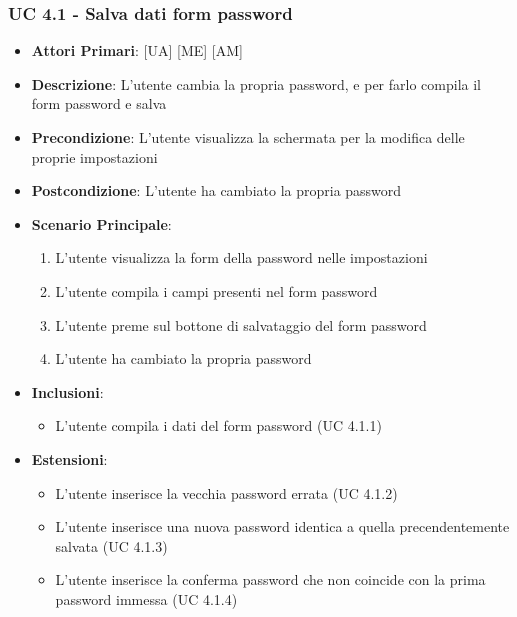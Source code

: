 			\subsubsection{UC 4.1 - Salva dati form password}
			\begin{itemize}
				\item \textbf{Attori Primari}: [UA] [ME] [AM]
				\item \textbf{Descrizione}: L'utente cambia la propria password, e per farlo compila il form password e salva
				\item \textbf{Precondizione}: L'utente visualizza la schermata per la modifica delle proprie impostazioni
				\item \textbf{Postcondizione}: L'utente ha cambiato la propria password
				\item \textbf{Scenario Principale}:
				\begin{enumerate}
					\item{L'utente visualizza la form della password nelle impostazioni}
					\item{L'utente compila i campi presenti nel form password}
					\item{L'utente preme sul bottone di salvataggio del form password}
					\item{L'utente ha cambiato la propria password}
				\end{enumerate}	
				\item \textbf{Inclusioni}:
					\begin{itemize}
						\item L'utente compila i dati del form password (UC 4.1.1)
					\end{itemize}
				\item \textbf{Estensioni}:
					\begin{itemize}
						\item L'utente inserisce la vecchia password errata (UC 4.1.2)
						\item L'utente inserisce una nuova password identica a quella precendentemente salvata (UC 4.1.3)
						\item L'utente inserisce la conferma password che non coincide con la prima password immessa (UC 4.1.4)
					\end{itemize}
			\end{itemize}

